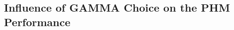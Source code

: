 \begin{comment}
\begin{figure}[H]
  \centering
  \texttt{[image: accuracy\_real\_world]}
  \caption {Source and Target Accuracies for model training with Regular FC + CNN MMD-loss (left), Regular FC MMD (middle) and No MMD-loss (right)} \label{fig:accuracy_real_world}
\end{figure}


\begin{figure}[H]
  \centering
  \texttt{[image: loss\_real\_world]}
  \caption {Loss for model training with Regular FC + CNN MMD-loss (left), Regular FC MMD (middle) and No MMD loss} \label{fig:loss_real_world}
\end{figure}


In fig. the development of the source CE and MMD-loss is shown. It can be seen, that the hyperparameter GAMMA was picked well, such that the MMD as well as the source CE-loss were able to be reduced smoothly throughout the trainings process. 


Unfortunately the MMD-loss could just minimize the domain discrepancy by a little. The domain discrepancy problem couldn't be solved completely. Still the idea of the MMD-loss becomes more clear in the experiments. Also the positive effect of the MMD-loss for the training is obvious. For the complex multi-dimensional dataset the MMD-loss is probably not sophisticated enough to detect and effectively fight the domain discrepancy.
\end{comment}






\subsection{Influence of GAMMA Choice on the PHM Performance}\label{ch:Influence_GAMMA_real_dataset}

